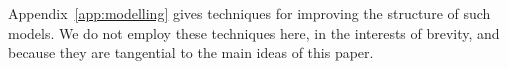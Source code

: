 Appendix~\ref{app:modelling} gives techniques for improving the structure of
such models.  We do not employ these techniques here, in the interests of
brevity, and because they are tangential to the main ideas of this paper.

%






